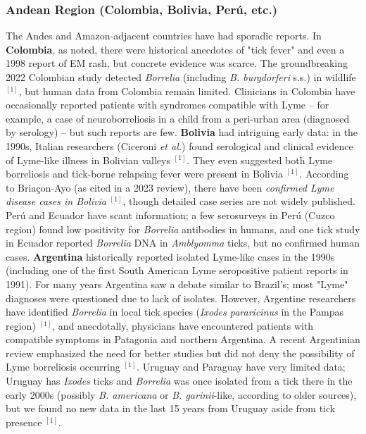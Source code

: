 \documentclass[11pt,letterpaper]{article}
\newcommand{\mycite}[1]{$^{[#1]}$}
\begin{document}
\subsubsection{Andean Region (Colombia, Bolivia, Perú, etc.)}
The Andes and Amazon-adjacent countries have had sporadic reports. In \textbf{Colombia}, as noted, there were historical anecdotes of "tick fever" and even a 1998 report of EM rash, but concrete evidence was scarce. The groundbreaking 2022 Colombian study detected \textit{Borrelia} (including \textit{B. burgdorferi} s.s.) in wildlife \mycite{1}, but human data from Colombia remain limited. Clinicians in Colombia have occasionally reported patients with syndromes compatible with Lyme – for example, a case of neuroborreliosis in a child from a peri-urban area (diagnosed by serology) – but such reports are few. \textbf{Bolivia} had intriguing early data: in the 1990s, Italian researchers (Ciceroni \textit{et al.}) found serological and clinical evidence of Lyme-like illness in Bolivian valleys \mycite{1}. They even suggested both Lyme borreliosis and tick-borne relapsing fever were present in Bolivia \mycite{1}. According to Briaçon-Ayo (as cited in a 2023 review), there have been \textit{confirmed Lyme disease cases in Bolivia} \mycite{1}, though detailed case series are not widely published. Perú and Ecuador have scant information; a few serosurveys in Perú (Cuzco region) found low positivity for \textit{Borrelia} antibodies in humans, and one tick study in Ecuador reported \textit{Borrelia} DNA in \textit{Amblyomma} ticks, but no confirmed human cases. \textbf{Argentina} historically reported isolated Lyme-like cases in the 1990s (including one of the first South American Lyme seropositive patient reports in 1991). For many years Argentina saw a debate similar to Brazil's; most "Lyme" diagnoses were questioned due to lack of isolates. However, Argentine researchers have identified \textit{Borrelia} in local tick species (\textit{Ixodes pararicinus} in the Pampas region) \mycite{1}, and anecdotally, physicians have encountered patients with compatible symptoms in Patagonia and northern Argentina. A recent Argentinian review emphasized the need for better studies but did not deny the possibility of Lyme borreliosis occurring \mycite{1}. Uruguay and Paraguay have very limited data; Uruguay has \textit{Ixodes} ticks and \textit{Borrelia} was once isolated from a tick there in the early 2000s (possibly \textit{B. americana} or \textit{B. garinii}-like, according to older sources), but we found no new data in the last 15 years from Uruguay aside from tick presence \mycite{1}.
\end{document}
